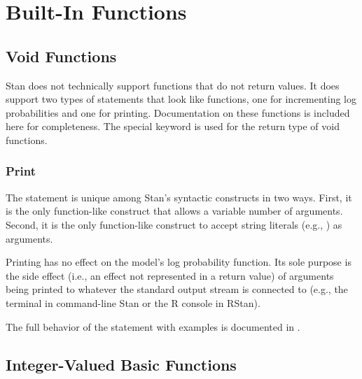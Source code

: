\part{Built-In Functions}\label{built-in-functions.part}

\chapter{Void Functions}

Stan does not technically support functions that do not return values.
It does support two types of statements that look like functions, one
for incrementing log probabilities and one for printing.
Documentation on these functions is included here for completeness.
The special keyword  is used for the return type of void
functions. 

\section{Print}

The  statement is unique among Stan's syntactic constructs
in two ways.  First, it is the only function-like construct that
allows a variable number of arguments.  Second, it is the only
function-like construct to accept string literals (e.g., ) as arguments.

Printing has no effect on the model's log probability function.  Its
sole purpose is the side effect (i.e., an effect not represented in a
return value) of arguments being printed to whatever the standard
output stream is connected to (e.g., the terminal in command-line Stan
or the R console in RStan).
%
\begin{description}
\end{description}
%
The full behavior of the  statement with examples is
documented in .


\chapter{Integer-Valued Basic Functions}

